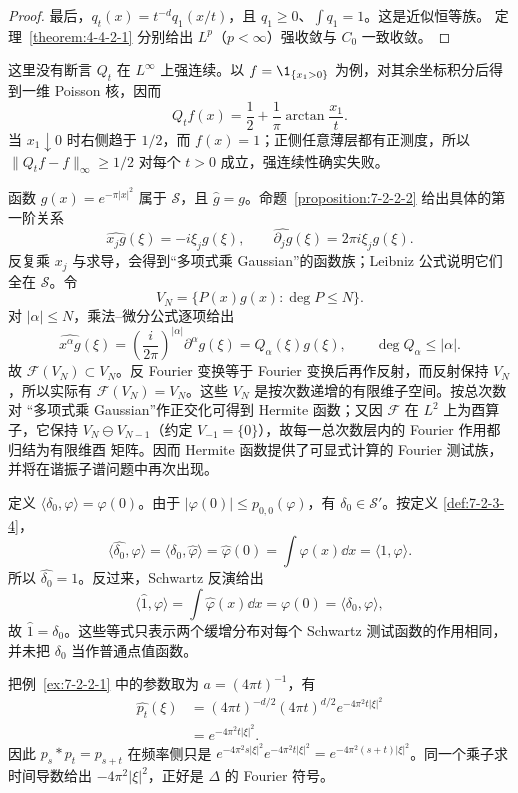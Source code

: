 \begin{proof}
最后，$q_t(x)=t^{-d}q_1(x/t)$，且 $q_1\geq0$、$\int q_1=1$。这是近似恒等族。
定理~\ref{theorem:4-4-2-1} 分别给出 $L^p$（$p<\infty$）强收敛与 $C_0$ 一致收敛。
\end{proof}

这里没有断言 $Q_t$ 在 $L^\infty$ 上强连续。以
$f=\1_{\{x_1>0\}}$ 为例，对其余坐标积分后得到一维 Poisson 核，因而
\[
 Q_tf(x)=\frac12+\frac1\pi\arctan\frac{x_1}{t}.
\]
当 $x_1\downarrow0$ 时右侧趋于 $1/2$，而 $f(x)=1$；正侧任意薄层都有正测度，所以
$\|Q_tf-f\|_\infty\geq1/2$ 对每个 $t>0$ 成立，强连续性确实失败。

\begin{example}\label{ex:7-2-3-1}
函数 $g(x)=e^{-\pi|x|^2}$ 属于 $\mathcal S$，且
$\widehat g=g$。命题~\ref{proposition:7-2-2-2} 给出具体的第一阶关系
\[
 \widehat{x_jg}(\xi)=-i\xi_jg(\xi),
 \qquad
 \widehat{\partial_jg}(\xi)=2\pi i\xi_jg(\xi).
\]
反复乘 $x_j$ 与求导，会得到“多项式乘 Gaussian”的函数族；Leibniz 公式说明它们全在
$\mathcal S$。令
\[
 V_N=\{P(x)g(x):\deg P\leq N\}.
\]
对 $|\alpha|\leq N$，乘法--微分公式逐项给出
\[
 \widehat{x^\alpha g}(\xi)
 =\left(\frac{i}{2\pi}\right)^{|\alpha|}\partial^\alpha g(\xi)
 =Q_\alpha(\xi)g(\xi),
 \qquad \deg Q_\alpha\leq|\alpha|.
\]
故 $\mathcal F(V_N)\subset V_N$。反 Fourier 变换等于 Fourier 变换后再作反射，而反射保持
$V_N$，所以实际有 $\mathcal F(V_N)=V_N$。这些 $V_N$ 是按次数递增的有限维子空间。按总次数对
“多项式乘 Gaussian”作正交化可得到 Hermite 函数；又因 $\mathcal F$ 在 $L^2$ 上为酉算子，它保持
$V_N\ominus V_{N-1}$（约定 $V_{-1}=\{0\}$），故每一总次数层内的 Fourier 作用都归结为有限维酉
矩阵。因而 Hermite 函数提供了可显式计算的 Fourier 测试族，并将在谐振子谱问题中再次出现。
\end{example}

\begin{example}[Dirac 分布]\label{ex:7-2-3-2}
定义 $\langle\delta_0,\varphi\rangle=\varphi(0)$。由于
$|\varphi(0)|\leq p_{0,0}(\varphi)$，有 $\delta_0\in\mathcal S'$。按定义
\ref{def:7-2-3-4}，
\[
 \langle\widehat{\delta_0},\varphi\rangle
 =\langle\delta_0,\widehat\varphi\rangle
 =\widehat\varphi(0)=\int\varphi(x)\dd x
 =\langle1,\varphi\rangle.
\]
所以 $\widehat{\delta_0}=1$。反过来，Schwartz 反演给出
\[
 \langle\widehat1,\varphi\rangle
 =\int\widehat\varphi(x)\dd x=\varphi(0)
 =\langle\delta_0,\varphi\rangle,
\]
故 $\widehat1=\delta_0$。这些等式只表示两个缓增分布对每个 Schwartz 测试函数的作用相同，并未把
$\delta_0$ 当作普通点值函数。
\end{example}

\begin{example}[热核]\label{ex:7-2-3-3}
把例~\ref{ex:7-2-2-1} 中的参数取为 $a=(4\pi t)^{-1}$，有
\begin{align*}
 \widehat{p_t}(\xi)
 &=(4\pi t)^{-d/2}
   (4\pi t)^{d/2}e^{-4\pi^2t|\xi|^2}\\
 &=e^{-4\pi^2t|\xi|^2}.
\end{align*}
因此 $p_s*p_t=p_{s+t}$ 在频率侧只是
$e^{-4\pi^2s|\xi|^2}e^{-4\pi^2t|\xi|^2}
=e^{-4\pi^2(s+t)|\xi|^2}$。同一个乘子求时间导数给出
$-4\pi^2|\xi|^2$，正好是 $\Delta$ 的 Fourier 符号。
\end{example}

